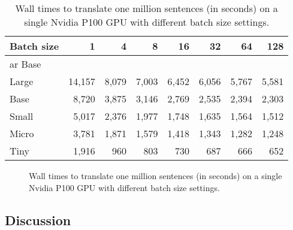 \begin{table}
  \centering

  \begin{tabular}{lrrrrrrr}
    \toprule
    Batch size & 1 & 4 & 8 & 16 & 32 & 64 & 128\\
    \midrule
    \acs{ar} Base &  &  &  &  &  &  & \\
    \midrule
    Large & 14,157 & 8,079 & 7,003 & 6,452 & 6,056 & 5,767 & 5,581 \\
    Base  &  8,720 & 3,875 & 3,146 & 2,769 & 2,535 & 2,394 & 2,303 \\
    Small &  5,017 & 2,376 & 1,977 & 1,748 & 1,635 & 1,564 & 1,512 \\
    Micro &  3,781 & 1,871 & 1,579 & 1,418 & 1,343 & 1,282 & 1,248 \\
    Tiny  &  1,916 &   960 &   803 &   730 &   687 &   666 &   652 \\
    \bottomrule
  \end{tabular}

  \caption{Wall times to translate one million sentences (in seconds) on a
    single Nvidia P100 GPU with different batch size settings.}
  \label{tab:throughput:p100}

\end{table}


\begin{figure}
  \centering
  

  \caption{Wall times to translate one million sentences (in seconds) on a
    single Nvidia P100 GPU with different batch size settings.}%
  \label{fig:throughput:p100}
\end{figure}

\subsection{Discussion}%
\label{subsec:results:discussion}



